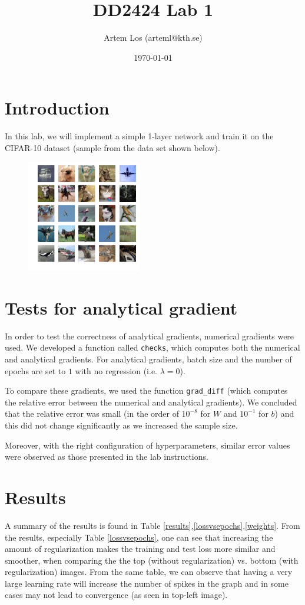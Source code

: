 \documentclass[10pt,a4paper]{article}
\title{DD2424 Lab 1}
\author{Artem Los (arteml@kth.se)}
\date{\today}
\begin{document}
\maketitle

\section*{Introduction}
In this lab, we will implement a simple 1-layer network and train it on the CIFAR-10 dataset (sample from the data set shown below).

\begin{figure}[H]
	\centering
	\includegraphics[width=5cm]{img/randompics.png}
\end{figure}

\section*{Tests for analytical gradient}
In order to test the correctness of analytical gradients, numerical gradients were used. We developed a function called \verb|checks|, which computes both the numerical and analytical gradients. For analytical gradients, batch size and the number of epochs are set to $1$ with no regression (i.e. $\lambda=0$).

To compare these gradients, we used the function \verb|grad_diff| (which computes the relative error between the numerical and analytical gradients). We concluded that the relative error was small (in the order of $10^{-8}$ for $W$ and $10^{-1}$ for $b$) and this did not change significantly as we increased the sample size.

Moreover, with the right configuration of hyperparameters, similar error values were observed as those presented in the lab instructions.

\section*{Results}
A summary of the results is found in Table \ref{results},\ref{lossvsepochs},\ref{weights}. From the results, especially Table \ref{lossvsepochs}, one can see that increasing the amount of regularization makes the training and test loss more similar and smoother, when comparing the the top (without regularization) vs. bottom (with regularization) images. From the same table, we can observe that having a very large learning rate will increase the number of spikes in the graph and in some cases may not lead to convergence (as seen in top-left image).
\end{document}
